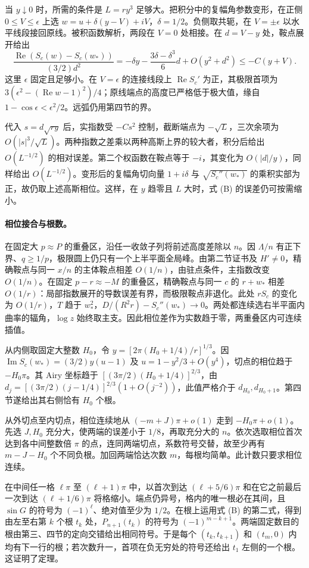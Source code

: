 \documentclass[UTF8,fontset=fandol,11pt,a4paper]{ctexart}
\newcommand{\Rea}{\operatorname{Re}}
\newcommand{\Ima}{\operatorname{Im}}
\begin{document}
当 $y\downarrow0$ 时，所需的条件是 $L=ry^3$ 足够大。把积分中的复幅角参数变形，在正侧 $0\le V\le\epsilon$ 上选 $w=u+\delta(y-V)+iV$，$\delta=1/2$。负侧取共轭，在 $V=\pm\epsilon$ 以水平线段接回原线。被积函数解析，两段在 $V=0$ 处相接。在 $d=V-y$ 处，鞍点展开给出
\[
 \frac{\Rea(S_c(w)-S_c(w_*))}{(3/2)d^2}
 =-\delta y-\frac{3\delta-\delta^3}{6}d+O(y^2+d^2)\le -C(y+V).
\]
这里 $\epsilon$ 固定且足够小。在 $V=\epsilon$ 的连接线段上 $\Rea S_c'$ 为正，其极限首项为 $3(\epsilon^2-(\Rea w-1)^2)/4$；原线端点的高度已严格低于极大值，缘自 $1-\cos\epsilon<\epsilon^2/2$。远弧仍用第四节的界。

代入 $s=d\sqrt{ry}$ 后，实指数受 $-C s^2$ 控制，截断端点为 $-\sqrt L$，三次余项为 $O(|s|^3/\sqrt L)$。两种指数之差乘以两种高斯上界的较大者，积分后给出 $O(L^{-1/2})$ 的相对误差。第二个权函数在鞍点等于 $-i$，其变化为 $O(|d|/y)$，同样给出 $O(L^{-1/2})$。变形后的复幅角切向量 $1+i\delta$ 与 $\sqrt{S_c''(w_*)}$ 的乘积实部为正，故仍取上述高斯相位。这样，在 $y$ 趋零且 $L$ 大时，式 (B) 的误差仍可按需缩小。

\paragraph{相位接合与根数。}
在固定大 $p\approx P$ 的重叠区，沿任一收敛子列将前述高度差除以 $n$。因 $\Lambda/n$ 有正下界、$q\ge1/p$，极限圆上仍只有一个上半平面全局峰。由第二节证书及 $H'\ne0$，精确鞍点与同一 $x/n$ 的主体鞍点相差 $O(1/n)$，由驻点条件，主指数改变 $O(1/n)$。在固定 $p-r\approx-M$ 的重叠区，精确鞍点与同一 $c$ 的 $r+w_*$ 相差 $O(1/r)$：局部指数展开的导数误差有界，而极限鞍点非退化。此处 $rS_c$ 的变化为 $O(1/r)$，$T$ 趋于 $w_*^2$，$D/(R^2r)-S_c''(w_*)\to0$。两处都连续选右半平面内曲率的辐角，$\log z$ 始终取主支。因此相位差作为实数趋于零，两重叠区内可连续插值。

从内侧取固定大整数 $H_0$，令 $y=[2\pi(H_0+1/4)/r]^{1/3}$。因 $\Ima S_c(w_*)=(3/2)y(u-1)$ 及 $u=1-y^2/3+O(y^4)$，切点的相位趋于 $-H_0\pi$。其 Airy 坐标趋于 $[(3\pi/2)(H_0+1/4)]^{2/3}$，由 $d_j=[(3\pi/2)(j-1/4)]^{2/3}(1+O(j^{-2}))$，此值严格介于 $d_{H_0},d_{H_0+1}$。第四节遂给出其右侧恰有 $H_0$ 个根。

从外切点至内切点，相位连续地从 $(-m+J)\pi+o(1)$ 走到 $-H_0\pi+o(1)$。先选 $J,H_0$ 充分大，使两端的误差小于 $1/8$，再取充分大的 $n$。依次选取相位首次达到各中间整数倍 $\pi$ 的点，连同两端切点，系数符号交替，故至少再有 $m-J-H_0$ 个不同负根。加回两端恰达次数 $m$，每根均简单。此计数只要求相位连续。

在中间任一格 $\ell\pi$ 至 $(\ell+1)\pi$ 中，以首次到达 $(\ell+5/6)\pi$ 和在它之前最后一次到达 $(\ell+1/6)\pi$ 将格缩小。端点仍异号，格内的唯一根必在其间，且 $\sin G$ 的符号为 $(-1)^\ell$、绝对值至少为 $1/2$。在根上运用式 (B) 的第二式，得到由左至右第 $k$ 个根 $t_k$ 处，$P_{n+1}(t_k)$ 的符号为 $(-1)^{m-k+1}$。两端固定数目的根由第三、四节的定向交错给出相同符号。于是每个 $(t_k,t_{k+1})$ 和 $(t_m,0)$ 内均有下一行的根；若次数升一，首项在负无穷处的符号还给出 $t_1$ 左侧的一个根。这证明了定理。
\end{document}

